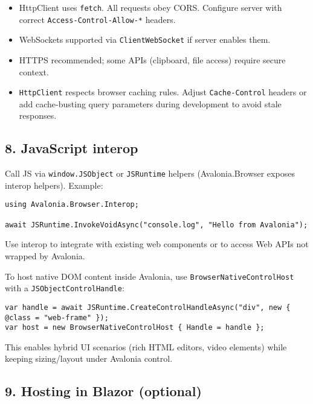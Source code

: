 \begin{itemize}
\tightlist
\item
  HttpClient uses \passthrough{\lstinline!fetch!}. All requests obey
  CORS. Configure server with correct
  \passthrough{\lstinline!Access-Control-Allow-*!} headers.
\item
  WebSockets supported via \passthrough{\lstinline!ClientWebSocket!} if
  server enables them.
\item
  HTTPS recommended; some APIs (clipboard, file access) require secure
  context.
\item
  \passthrough{\lstinline!HttpClient!} respects browser caching rules.
  Adjust \passthrough{\lstinline!Cache-Control!} headers or add
  cache-busting query parameters during development to avoid stale
  responses.
\end{itemize}

\subsection{8. JavaScript interop}\label{javascript-interop}

Call JS via \passthrough{\lstinline!window.JSObject!} or
\passthrough{\lstinline!JSRuntime!} helpers (Avalonia.Browser exposes
interop helpers). Example:

\begin{lstlisting}
using Avalonia.Browser.Interop;

await JSRuntime.InvokeVoidAsync("console.log", "Hello from Avalonia");
\end{lstlisting}

Use interop to integrate with existing web components or to access Web
APIs not wrapped by Avalonia.

To host native DOM content inside Avalonia, use
\passthrough{\lstinline!BrowserNativeControlHost!} with a
\passthrough{\lstinline!JSObjectControlHandle!}:

\begin{lstlisting}
var handle = await JSRuntime.CreateControlHandleAsync("div", new { @class = "web-frame" });
var host = new BrowserNativeControlHost { Handle = handle };
\end{lstlisting}

This enables hybrid UI scenarios (rich HTML editors, video elements)
while keeping sizing/layout under Avalonia control.

\subsection{9. Hosting in Blazor
(optional)}\label{hosting-in-blazor-optional}

